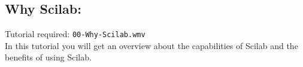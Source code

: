 \documentclass[11pt]{article}
\begin{document}
\begin{multicols}{2}
\section{Why Scilab:}
Tutorial required: {\tt 00-Why-Scilab.wmv} \\
In this tutorial you will get an overview about the capabilities of Scilab and the benefits of using Scilab.





\end{multicols}
\end{document}
